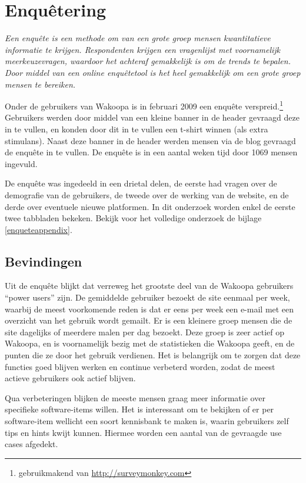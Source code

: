 \documentclass[a4paper, 10pt, pdftex]{report}
\begin{document}
    \section{Enqu\^etering}
    \textit{Een enqu\^ete is een methode om van een grote groep mensen kwantitatieve informatie te krijgen. Respondenten krijgen een vragenlijst met voornamelijk meerkeuzevragen, waardoor het achteraf gemakkelijk is om de trends te bepalen. Door middel van een online enqu\^etetool is het heel gemakkelijk om een grote groep mensen te bereiken.}

    Onder de gebruikers van Wakoopa is in februari 2009 een enqu\^ete verspreid.\footnote{gebruikmakend van \url{http://surveymonkey.com}} Gebruikers werden door middel van een kleine banner in de header gevraagd deze in te vullen, en konden door dit in te vullen een t-shirt winnen (als extra stimulans). Naast deze banner in de header werden mensen via de blog gevraagd de enqu\^ete in te vullen. De enqu\^ete is in een aantal weken tijd door 1069 mensen ingevuld.

    De enqu\^ete was ingedeeld in een drietal delen, de eerste had vragen over de demografie van de gebruikers, de tweede over de werking van de website, en de derde over eventuele nieuwe platformen. In dit onderzoek worden enkel de eerste twee tabbladen bekeken. Bekijk voor het volledige onderzoek de bijlage \ref{enqueteappendix}.
  \subsection{Bevindingen}
    Uit de enqu\^ete blijkt dat verreweg het grootste deel van de Wakoopa gebruikers ``power users'' zijn. De gemiddelde gebruiker bezoekt de site eenmaal per week, waarbij de meest voorkomende reden is dat er eens per week een e-mail met een overzicht van het gebruik wordt gemailt. Er is een kleinere groep mensen die de site dagelijks of meerdere malen per dag bezoekt. Deze groep is zeer actief op Wakoopa, en is voornamelijk bezig met de statistieken die Wakoopa geeft, en de punten die ze door het gebruik verdienen. Het is belangrijk om te zorgen dat deze functies goed blijven werken en continue verbeterd worden, zodat de meest actieve gebruikers ook actief blijven.

    Qua verbeteringen blijken de meeste mensen graag meer informatie over specifieke software-items willen. Het is interessant om te bekijken of er per software-item wellicht een soort kennisbank te maken is, waarin gebruikers zelf tips en hints kwijt kunnen. Hiermee worden een aantal van de gevraagde use cases afgedekt.
\end{document}
